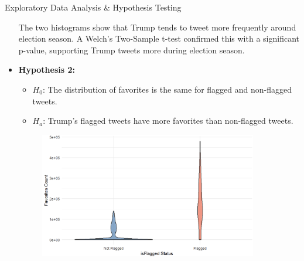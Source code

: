 \documentclass[final]{beamer}
\newlength{\colwidth}
\begin{document}
\begin{frame}[t]
\begin{columns}[t]
\begin{column}{\colwidth}
\begin{block}{Exploratory Data Analysis \& Hypothesis Testing}
\begin{itemize}
\begin{figure}
                    \hfill
                \end{figure}
        The two histograms show that Trump tends to tweet more frequently around election season. A Welch's Two-Sample t-test confirmed this with a significant p-value, supporting Trump tweets more during election season.
            \item \textbf{Hypothesis 2:}
                \begin{itemize}
                    \item[] $H_0$: The distribution of favorites is the same for flagged and non-flagged tweets.
                    \item[] $H_a$: Trump's flagged tweets have more favorites than non-flagged tweets.
                \end{itemize}
                \begin{figure}
                        \centering
                        \includegraphics[width=0.9\textwidth]{figures/favoritesviolincrop.png}

\end{figure}
\end{itemize}
\end{block}
\end{column}
\end{columns}
\end{frame}
\end{document}

